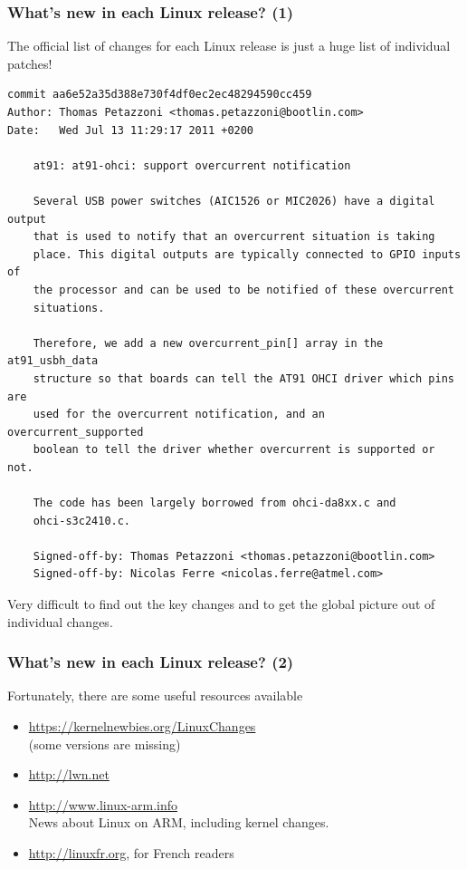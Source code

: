 \begin{frame}[fragile]
  \frametitle{What's new in each Linux release? (1)}
  The official list of changes for each Linux release is just a
  huge list of individual patches!
\Tiny
    \begin{verbatim}
commit aa6e52a35d388e730f4df0ec2ec48294590cc459
Author: Thomas Petazzoni <thomas.petazzoni@bootlin.com>
Date:   Wed Jul 13 11:29:17 2011 +0200

    at91: at91-ohci: support overcurrent notification

    Several USB power switches (AIC1526 or MIC2026) have a digital output
    that is used to notify that an overcurrent situation is taking
    place. This digital outputs are typically connected to GPIO inputs of
    the processor and can be used to be notified of these overcurrent
    situations.

    Therefore, we add a new overcurrent_pin[] array in the at91_usbh_data
    structure so that boards can tell the AT91 OHCI driver which pins are
    used for the overcurrent notification, and an overcurrent_supported
    boolean to tell the driver whether overcurrent is supported or not.

    The code has been largely borrowed from ohci-da8xx.c and
    ohci-s3c2410.c.

    Signed-off-by: Thomas Petazzoni <thomas.petazzoni@bootlin.com>
    Signed-off-by: Nicolas Ferre <nicolas.ferre@atmel.com>
\end{verbatim}
\normalsize
  Very difficult to find out the key changes and to get the
  global picture out of individual changes.
\end{frame}

\begin{frame}
  \frametitle{What's new in each Linux release? (2)}
  Fortunately, there are some useful resources available
  \begin{itemize}
    \item \url{https://kernelnewbies.org/LinuxChanges}\\
	(some versions are missing)
    \item \url{http://lwn.net}
    \item \url{http://www.linux-arm.info}\\
	News about Linux on ARM, including kernel changes.
    \item \url{http://linuxfr.org}, for French readers
  \end{itemize}
\end{frame}
